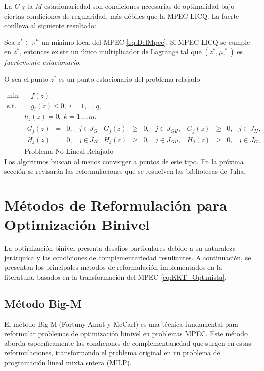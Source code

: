 La $C$ y la $M$ estacionariedad  son condiciones necesarias de optimalidad bajo ciertas condiciones de regularidad, m\'as débiles que la  MPEC-LICQ. La fuerte conlleva al siguiente resultado:
\begin{theorem} 
Sea $z^* \in \mathbb{R}^n$ un mínimo local del MPEC \eqref{eq:DefMpec}. Si MPEC-LICQ se cumple en $z^*$, entonces existe un único multiplicador de Lagrange  tal que $(z^*, \mu, ^*)$ es \textit{fuertemente estacionario}.
\end{theorem}
O sea el punto $z^*$ es un punto estacionario del problema relajado 

\begin{equation}
\begin{array}{cl}
\min  &\quad  f(z)  \\
\text{s.t.} &\quad  g_i(z) \leq 0, \;i=1,\ldots,q, \\ &h_k(z) = 0,\;k=1\ldots,m, \\
&\begin{array}{ccccccccccccccccc}G_j(z) &=& 0, & j\in J_G& G_j(z) &\geq& 0, &j\in J_{GH},& G_j(z) &\geq& 0, & j\in J_H,\\ 
H_j(z) &=& 0, & j\in J_H& H_j(z) &\geq& 0, & j\in J_{GH},& H_j(z) &\geq& 0, & j\in J_G,\end{array}\\
& \text{Problema No Lineal Relajado }  
\end{array}
\label{eRNLP}
\end{equation}Los algoritmos buscan al menos converger a puntos de este tipo.  En la pr\'oxima sección se revisar\'an las reformulaciones que se resuelven  las bibliotecas de Julia.
\section{Métodos de Reformulación para Optimización Binivel}
La optimización binivel presenta desafíos particulares debido a su naturaleza jerárquica y las condiciones de complementariedad resultantes. A continuación, se presentan los principales métodos de reformulación implementados en la literatura, basados en la transformación del MPEC \eqref{eq:KKT_Optimista}.
\subsection{Método Big-M}

El método Big-M (Fortuny-Amat y McCarl)  es una técnica fundamental para reformular problemas de optimización binivel en problemas MPEC. 
Este método aborda específicamente las condiciones de complementariedad que surgen en estas reformulaciones, transformando el problema original en un problema de programación lineal mixta entera (MILP).

